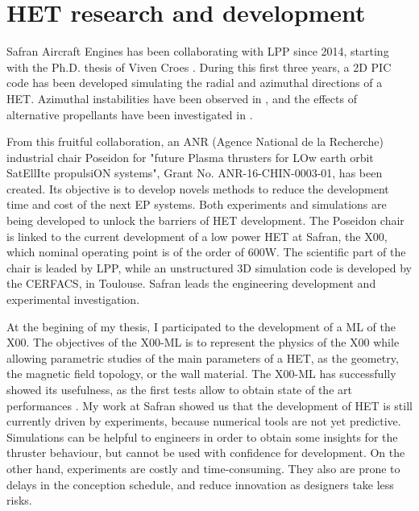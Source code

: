 

\section*{\ac{HET} research and development}
\label{sec-poseidon}

Safran Aircraft Engines has been collaborating with \ac{LPP} since 2014, starting with the Ph.D. thesis of Viven Croes \citep{croes2017}.
During this first three years, a \ac{2D} \ac{PIC} code has been developed simulating the radial and azimuthal directions of a \ac{HET}.
Azimuthal instabilities have been observed in \citet{croes2017a}, and the effects of alternative propellants have been investigated in \citet{croes2018}.

From this fruitful collaboration, an ANR (Agence National de la Recherche) industrial chair {\sc Poseidon} for  "future Plasma thrusters for LOw earth orbit SatEllIte propulsiON systems", Grant No. ANR-16-CHIN-0003-01, has been created.
Its objective is to develop novels methods to reduce the development time and cost of the next \ac{EP} systems.
Both experiments and simulations are being developed to unlock the barriers of \ac{HET} development.
The {\sc Poseidon} chair is linked to the current development of a  low power \ac{HET} at Safran, the \PPS X00, which nominal operating point is of the order of 600W.
The scientific part of the chair is leaded by \ac{LPP}, while an unstructured \ac{3D} simulation code is developed by the CERFACS, in Toulouse.
Safran leads the engineering development and experimental investigation.

At the begining of my thesis, I participated to the development of a \ac{ML} of the \PPS X00.
The objectives of the \PPS X00-\ac{ML}  is to represent the physics of the \PPS X00 while allowing parametric studies of the main parameters of a \ac{HET}, as the geometry, the magnetic field topology, or the wall material.
The \PPS X00-\ac{ML} has successfully showed its usefulness, as the first tests allow to obtain state of the art performances \citep{vaudolon2018}.
My work at Safran showed us that the development of \ac{HET} is still currently driven by experiments, because numerical tools are not yet predictive.
Simulations can be helpful to engineers in order to obtain some insights for the thruster behaviour, but cannot be used with confidence for development.
On the other hand, experiments are costly and time-consuming.
They also are prone to delays in the conception schedule, and reduce innovation as designers take less risks.

